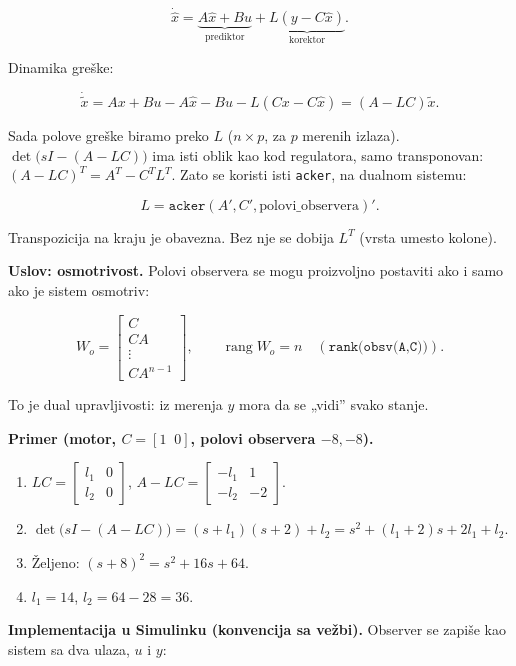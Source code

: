 \documentclass[11pt,a4paper,parskip=half,headsepline,numbers=noenddot]{scrartcl}
\begin{document}
\[\dot{\hat x} = \underbrace{A\hat x + Bu}_{\text{prediktor}} + \underbrace{L(y - C\hat x)}_{\text{korektor}} .\]

Dinamika greške:

\[\dot{\tilde x} = Ax + Bu - A\hat x - Bu - L(Cx - C\hat x) = (A - LC)\tilde x .\]

Sada polove greške biramo preko \(L\) (\(n\times p\), za \(p\) merenih izlaza). \(\det\big(sI - (A - LC)\big)\) ima isti oblik kao kod regulatora, samo transponovan: \((A - LC)^T = A^T - C^TL^T\). Zato se koristi isti \texttt{acker}, na dualnom sistemu:

\[L = \texttt{acker}(A', C', \text{polovi\_observera})' .\]

Transpozicija na kraju je obavezna. Bez nje se dobija \(L^T\) (vrsta umesto kolone).

\textbf{Uslov: osmotrivost.} Polovi observera se mogu proizvoljno postaviti ako i samo ako je sistem osmotriv:

\[W_o = \begin{bmatrix}C\\ CA\\ \vdots\\ CA^{n-1}\end{bmatrix},\qquad \operatorname{rang}W_o = n \quad(\texttt{rank(obsv(A,C))}).\]

To je dual upravljivosti: iz merenja \(y\) mora da se „vidi'' svako stanje.

\textbf{Primer (motor, \(C = [1\;\; 0]\), polovi observera \(-8, -8\)).}

\begin{enumerate}
\def\labelenumi{\arabic{enumi}.}
\item \(LC = \begin{bmatrix}l_1 & 0\\ l_2 & 0\end{bmatrix}\), \(A - LC = \begin{bmatrix}-l_1 & 1\\ -l_2 & -2\end{bmatrix}\).
\item \(\det\big(sI - (A - LC)\big) = (s + l_1)(s + 2) + l_2 = s^2 + (l_1 + 2)s + 2l_1 + l_2\).
\item Željeno: \((s+8)^2 = s^2 + 16s + 64\).
\item \(l_1 = 14\), \(l_2 = 64 - 28 = 36\).
\end{enumerate}

\textbf{Implementacija u Simulinku (konvencija sa vežbi).} Observer se zapiše kao sistem sa dva ulaza, \(u\) i \(y\):
\end{document}
